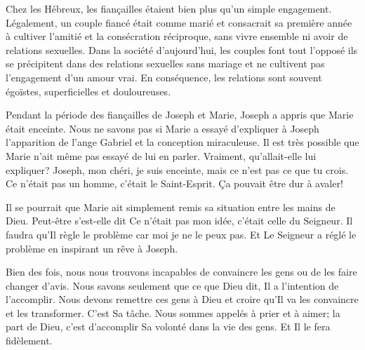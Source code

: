 


Chez les Hébreux, les fiançailles étaient bien plus qu'un simple engagement. Légalement, un couple fiancé était comme marié et consacrait sa première année à cultiver l'amitié et la consécration réciproque, sans vivre ensemble ni avoir de relations sexuelles. Dans la société d'aujourd'hui, les couples font tout l'opposé \ocadr ils se précipitent dans des relations sexuelles sans mariage et ne cultivent pas l'engagement d'un amour vrai. En conséquence, les relations sont souvent égoïstes, superficielles et douloureuses.

Pendant la période des fiançailles de Joseph et Marie, Joseph a appris que Marie était enceinte. Nous ne savons pas si Marie a essayé d'expliquer à Joseph l'apparition de l'ange Gabriel et la conception miraculeuse. Il est très possible que Marie n'ait même pas essayé de lui en parler. Vraiment, qu'allait-elle lui expliquer? \Og Joseph, mon chéri, je suis enceinte, mais ce n'est pas ce que tu crois. Ce n'était pas un homme, c'était le Saint-Esprit. \Fg{} Ça pouvait être dur à avaler!

Il se pourrait que Marie ait simplement remis sa situation entre les mains de Dieu. Peut-être s'est-elle dit\frcolon{} \Og Ce n'était pas mon idée, c'était celle du Seigneur. Il faudra qu'Il règle le problème car moi je ne le peux pas. \Fg{} Et Le Seigneur a réglé le problème en inspirant un rêve à Joseph.

Bien des fois, nous nous trouvons incapables de convaincre les gens ou de les faire changer d'avis. Nous savons seulement que ce que Dieu dit, Il a l'intention de l'accomplir. Nous devons remettre ces gens à Dieu et croire qu'Il va les convaincre et les transformer. C'est Sa tâche. Nous sommes appelés à prier et à aimer; la part de Dieu, c'est d'accomplir Sa volonté dans la vie des gens. Et Il le fera fidèlement.




                      

